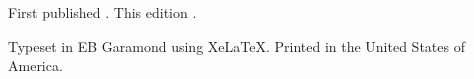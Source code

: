 
\cleardoublepage
\thispagestyle{empty}
\begin{titlepage}
  \centering
  \vspace*{3em}

  {\Huge\bfseries \BookTitle\par}
  \vspace{0.5em}
  {\Large \itshape \BookSubtitle\par}

  \vspace{3em}
  {\large \BookAuthor\par}

  \vfill


  {\PublisherName\par}
  {\PublisherCity\par}

  \vspace*{2em}
\end{titlepage}

\thispagestyle{empty}
\vspace*{\fill}

{

\medskip
\noindent \ISBN

\medskip
\noindent \EditionNote

\medskip
\noindent First published \OriginalPubYear. This edition \ThisEditionYear.

\medskip
\noindent Typeset in EB Garamond using XeLaTeX. Printed in the United States of America.


\medskip
\noindent \PublisherName\\
\PublisherCity
}

\vspace*{\fill}
\cleardoublepage
